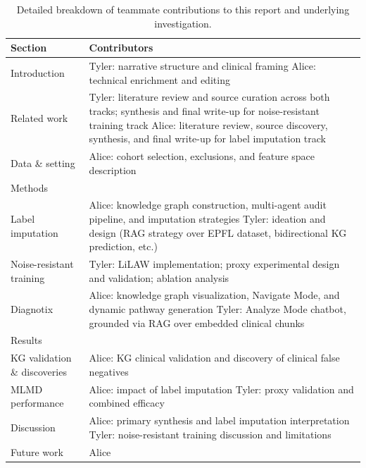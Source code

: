 \begin{table}[ht]
\centering
\caption{Detailed breakdown of teammate contributions to this report and underlying investigation.}
\label{tab:contributions}
\small
\begin{tabularx}{\textwidth}{@{} l X @{}}
\toprule
\textbf{Section} & \textbf{Contributors} \\
\midrule
Introduction          & Tyler: narrative structure and clinical framing \newline
                        Alice: technical enrichment and editing \\
\addlinespace
Related work          & Tyler: literature review and source curation across both tracks; synthesis and final write-up for noise-resistant training track \newline
                        Alice: literature review, source discovery, synthesis, and final write-up for label imputation track \\
\addlinespace
Data \& setting       & Alice: cohort selection, exclusions, and feature space description \\
\addlinespace
Methods               & \\
\addlinespace
\hspace{1em}Label imputation      & Alice: knowledge graph construction, multi-agent audit pipeline, and imputation strategies \newline
                                    Tyler: ideation and design (RAG strategy over EPFL dataset, bidirectional KG prediction, etc.) \\
\addlinespace
\hspace{1em}Noise-resistant training & Tyler: LiLAW implementation; proxy experimental design and validation; ablation analysis \\
\addlinespace
\hspace{1em}Diagnotix             & Alice: knowledge graph visualization, Navigate Mode, and dynamic pathway generation \newline
                                    Tyler: Analyze Mode chatbot, grounded via RAG over embedded clinical chunks \\
\addlinespace
Results               & \\
\addlinespace
\hspace{1em}KG validation \& discoveries & Alice: KG clinical validation and discovery of clinical false negatives \\
\addlinespace
\hspace{1em}MLMD performance      & Alice: impact of label imputation \newline
                                    Tyler: proxy validation and combined efficacy \\
\addlinespace
\midrule
Discussion            & Alice: primary synthesis and label imputation interpretation \newline
                        Tyler: noise-resistant training discussion and limitations \\
\addlinespace
Future work           & Alice \\
\bottomrule
\end{tabularx}
\end{table}

